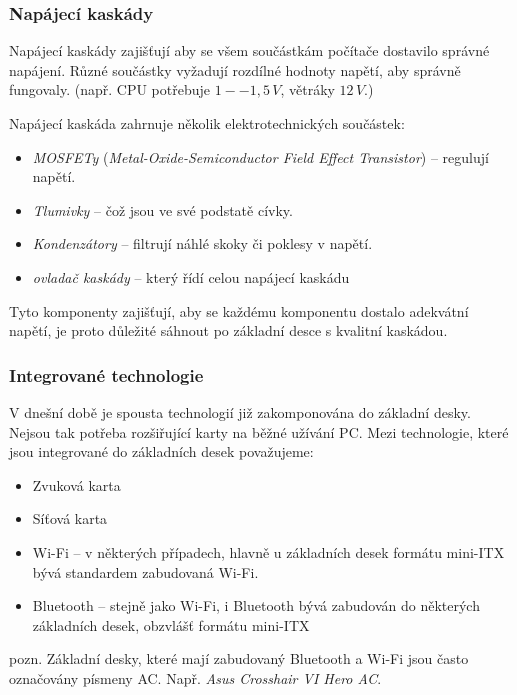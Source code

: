 \documentclass[a4paper]{article}
\begin{document}
        \subsubsection{Napájecí kaskády}
            Napájecí kaskády zajišťují aby se všem součástkám počítače dostavilo správné napájení. Různé součástky vyžadují rozdílné hodnoty napětí, aby správně fungovaly. (např. CPU potřebuje $1--1,5\,V$, větráky $12\,V$.) \par
            Napájecí kaskáda zahrnuje několik elektrotechnických součástek:
            \begin{itemize}
                \item \textit{MOSFETy} (\textit{Metal-Oxide-Semiconductor Field Effect Transistor}) -- regulují napětí.
                \item \textit{Tlumivky} -- čož jsou ve své podstatě cívky. 
                \item \textit{Kondenzátory} -- filtrují náhlé skoky či poklesy v napětí.
                \item \textit{ovladač kaskády} -- který řídí celou napájecí kaskádu
            \end{itemize}
            Tyto komponenty zajišťují, aby se každému komponentu dostalo adekvátní napětí, je proto důležité sáhnout po základní desce s kvalitní kaskádou.
        \subsubsection{Integrované technologie}
            V dnešní době je spousta technologií již zakomponována do základní desky. Nejsou tak potřeba rozšiřující karty na běžné užívání PC. Mezi technologie, které jsou integrované do základních desek považujeme:
            \begin{itemize}
                \item Zvuková karta
                \item Síťová karta
                \item Wi-Fi -- v některých případech, hlavně u základních desek formátu mini-ITX bývá standardem zabudovaná Wi-Fi.
                \item Bluetooth -- stejně jako Wi-Fi, i Bluetooth bývá zabudován do některých základních desek, obzvlášť formátu mini-ITX
            \end{itemize} \par
            pozn. Základní desky, které mají zabudovaný Bluetooth a Wi-Fi jsou často označovány písmeny AC. Např. \textit{Asus Crosshair VI Hero AC}.
\end{document}
